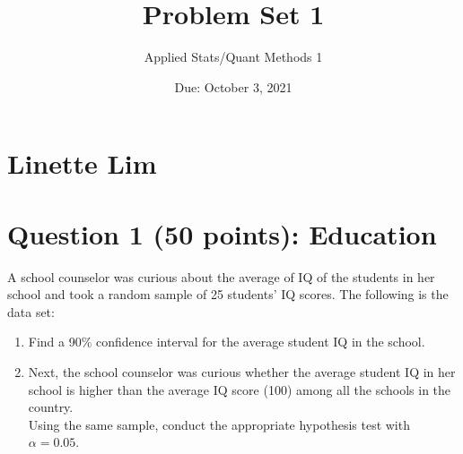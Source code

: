 \documentclass[12pt,letterpaper]{article}
\title{Problem Set 1}
\date{Due: October 3, 2021}
\author{Applied Stats/Quant Methods 1}
\begin{document}
	\maketitle
	
	\section*{Linette Lim}
	\vspace{.7cm}
	\section*{Question 1 (50 points): Education}

A school counselor was curious about the average of IQ of the students in her school and took a random sample of 25 students' IQ scores. The following is the data set:\\
\vspace{.5cm}

  

\vspace{.5cm}

\begin{enumerate}
	\item Find a 90\% confidence interval for the average student IQ in the school.\\
	
	\item Next, the school counselor was curious  whether  the average student IQ in her school is higher than the average IQ score (100) among all the schools in the country.\\ 
	
	\noindent Using the same sample, conduct the appropriate hypothesis test with $\alpha=0.05$.
\end{enumerate}
\end{document}
